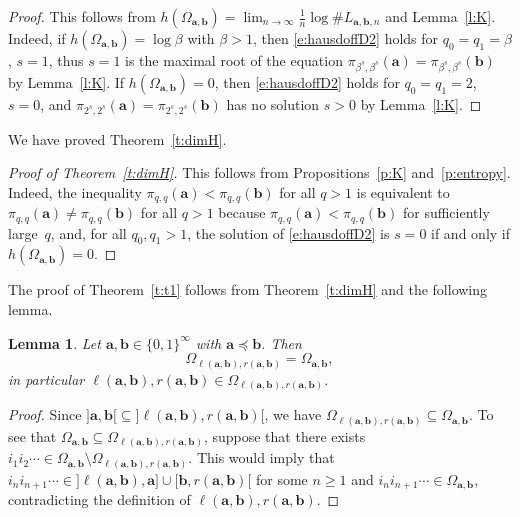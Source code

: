 \documentclass{amsart}
\newtheorem{lemma}[theorem]{Lemma}
\theoremstyle{definition}
\numberwithin{equation}{section}
\newcommand{\ba}{\mathbf{a}}
\newcommand{\bb}{\mathbf{b}}
\begin{document}
\begin{proof}
This follows from $h(\Omega_{\ba,\bb}) = \lim_{n\to\infty} \frac{1}{n} \log \# L_{\ba,\bb,n}$ and Lemma~\ref{l:K}.
Indeed, if $h(\Omega_{\ba,\bb}) = \log \beta$ with $\beta > 1$, then \eqref{e:hausdoffD2} holds for $q_0 = q_1 = \beta$, $s = 1$, thus $s = 1$ is the maximal root of the equation $\pi_{\beta^s,\beta^s}(\ba) = \pi_{\beta^s,\beta^s}(\bb)$ by Lemma~\ref{l:K}.
If $h(\Omega_{\ba,\bb}) = 0$, then \eqref{e:hausdoffD2} holds for $q_0 = q_1 = 2$, $s = 0$, and $\pi_{2^s,2^s}(\ba) = \pi_{2^s,2^s}(\bb)$ has no solution $s > 0$ by Lemma~\ref{l:K}.
\end{proof}

We have proved Theorem~\ref{t:dimH}.

\begin{proof}[Proof of Theorem~\ref{t:dimH}]
This follows from Propositions~\ref{p:K} and~\ref{p:entropy}.
Indeed, the inequality $\pi_{q,q}(\ba) < \pi_{q,q}(\bb)$ for all $q > 1$ is equivalent to $\pi_{q,q}(\ba) \ne \pi_{q,q}(\bb)$ for all $q > 1$ because $\pi_{q,q}(\ba) < \pi_{q,q}(\bb)$ for sufficiently large~$q$, and, for all $q_0,q_1>1$, the solution of \eqref{e:hausdoffD2} is $s = 0$ if and only if $h(\Omega_{\ba,\bb}) = 0$.
\end{proof}

The proof of Theorem~\ref{t:t1} follows from Theorem~\ref{t:dimH} and the following lemma.

\begin{lemma} \label{l:laba}
Let $\ba,\bb \in \{0,1\}^\infty$ with $\ba \preceq \bb$. 
Then 
\[
\Omega_{\ell(\ba,\bb),r(\ba,\bb)} = \Omega_{\ba,\bb},
\]
in particular $\ell(\ba,\bb), r(\ba,\bb) \in \Omega_{\ell(\ba,\bb),r(\ba,\bb)}$.
\end{lemma}

\begin{proof}
Since ${]}\ba,\bb{[} \subseteq {]}\ell(\ba,\bb),r(\ba,\bb){[}$, we have $\Omega_{\ell(\ba,\bb),r(\ba,\bb)} \subseteq \Omega_{\ba,\bb}$.
To see that $\Omega_{\ba,\bb} \subseteq \Omega_{\ell(\ba,\bb),r(\ba,\bb)}$, suppose that there exists $i_1i_2\cdots \in \Omega_{\ba,\bb} \setminus \Omega_{\ell(\ba,\bb),r(\ba,\bb)}$.
This would imply that $i_ni_{n+1}\cdots \in {]}\ell(\ba,\bb),\ba] \cup [\bb,r(\ba,\bb){[}$ for some $n \ge 1$ and $i_ni_{n+1}\cdots \in \Omega_{\ba,\bb}$, contradicting the definition of $\ell(\ba,\bb),r(\ba,\bb)$. 
\end{proof}
\end{document}
